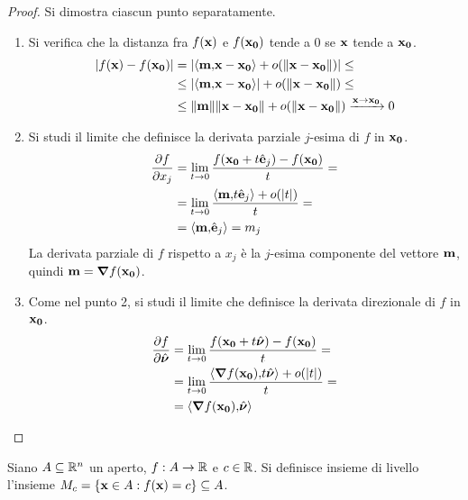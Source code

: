 \begin{proof}
    Si dimostra ciascun punto separatamente.
    \begin{enumerate}
        \item Si verifica che la distanza fra $f(\vb{x})$ e $f(\vb{x_0})$ tende a $0$ se $\vb{x}$ tende a $\vb{x_0}$.
        \begin{align*}
            \abs{f(\vb{x})-f(\vb{x_0})}&=\abs{\left\langle\vb{m}{,}\vb{x}-\vb{x_0}\right\rangle+o(\norm{\vb{\vb{x}-\vb{x_0}}})}\leq\\
            &\leq\abs{\left\langle\vb{m}{,}\vb{\vb{x}-\vb{x_0}}\right\rangle}+o(\norm{\vb{\vb{x}-\vb{x_0}}})\leq\\
            &\leq\norm{\vb{m}}\norm{\vb{x}-\vb{x_0}}+o(\norm{\vb{x}-\vb{x_0}})\xrightarrow{\vb{x}\to\vb{x_0}} 0
        \end{align*}

        \item Si studi il limite che definisce la derivata parziale $j$-esima di $f$ in $\vb{x_0}$.
        \begin{align*}
            \frac{\partial f}{\partial x_j}&=\lim_{t\to 0}\frac{f(\vb{x_0}+t\hat{\vb{e}}_j)-f(\vb{x_0})}{t}=\\
            &=\lim_{t\to 0}\frac{\left\langle\vb{m}{,}t\hat{\vb{e}}_j\right\rangle + o(\abs{t})}{t}=\\
            &=\left\langle\vb{m}{,}\hat{\vb{e}}_j\right\rangle=m_j
        \end{align*}
        La derivata parziale di $f$ rispetto a $x_j$ è la $j$-esima componente del vettore $\vb{m}$, quindi $\vb{m}=\grad f(\vb{x_0})$.

        \item Come nel punto 2, si studi il limite che definisce la derivata direzionale di $f$ in $\vb{x_0}$.
        \begin{align*}
            \frac{\partial f}{\partial \hat{\bm \nu}}&=\lim_{t\to 0}\frac{f(\vb{x_0}+t\hat{\bm \nu})-f(\vb{x_0})}{t}=\\
            &=\lim_{t\to 0}\frac{\left\langle\grad f(\vb{x_0}){,}t\hat{\bm \nu}\right\rangle + o(\abs{t})}{t}=\\
            &=\left\langle\grad f(\vb{x_0}){,}\hat{\bm \nu}\right\rangle
        \end{align*}
    \end{enumerate}
\end{proof}

\begin{definition}
    Siano $A \subseteq \mathbb{R}^n$ un aperto, $f:A \to \mathbb{R}$ e $c \in \mathbb{R}$. Si definisce insieme di livello l'insieme $M_c = \{ \vb{x} \in A : f(\vb{x})=c\}\subseteq A$.
\end{definition}

